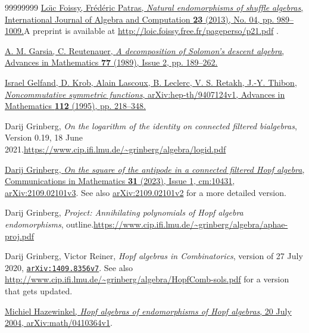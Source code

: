 \documentclass[numbers=enddot,12pt,final,onecolumn,notitlepage]{scrartcl}%
\theoremstyle{definition}
\begin{document}
\begin{thebibliography}{99999999}
%
\href{https://doi.org/10.1142/S0218196713400183}{Lo\"{\i}c Foissy,
Fr\'{e}d\'{e}ric Patras, \textit{Natural endomorphisms of shuffle algebras},
International Journal of Algebra and Computation \textbf{23} (2013), No. 04,
pp. 989--1009.}\newline A preprint is available at
\url{http://loic.foissy.free.fr/pageperso/p21.pdf} .

%
\href{https://doi.org/10.1016/0001-8708(89)90020-0}{A. M. Garsia, C.
Reutenauer, \textit{A decomposition of Solomon's descent algebra}, Advances in
Mathematics \textbf{77} (1989), Issue 2, pp. 189--262.}

\href{https://arxiv.org/abs/hep-th/9407124v1}{Israel
Gelfand, D. Krob, Alain Lascoux, B. Leclerc, V. S. Retakh, J.-Y. Thibon,
\textit{Noncommutative symmetric functions}, arXiv:hep-th/9407124v1, Advances
in Mathematics \textbf{112} (1995), pp. 218--348.}

Darij Grinberg, \textit{On the logarithm of the
identity on connected filtered bialgebras}, Version 0.19, 18 June
2021.\newline\url{https://www.cip.ifi.lmu.de/~grinberg/algebra/logid.pdf}

%
\href{https://doi.org/10.46298/cm.10431}{Darij Grinberg, \textit{On the square
of the antipode in a connected filtered Hopf algebra}, Communications in
Mathematics \textbf{31} (2023), Issue 1, cm:10431},
\href{https://arxiv.org/abs/2109.02101v3}{arXiv:2109.02101v3}. \newline See
also \href{https://arxiv.org/abs/2109.02101v2}{arXiv:2109.02101v2} for a more
detailed version.

Darij Grinberg, \textit{Project: Annihilating
polynomials of Hopf algebra endomorphisms}, outline.\newline\url{https://www.cip.ifi.lmu.de/~grinberg/algebra/aphae-proj.pdf}

Darij Grinberg, Victor Reiner, \textit{Hopf algebras
in Combinatorics}, version of 27 July 2020,
\href{http://www.arxiv.org/abs/1409.8356v7}{\texttt{arXiv:1409.8356v7}}.
\newline See also
\url{http://www.cip.ifi.lmu.de/~grinberg/algebra/HopfComb-sols.pdf} for a
version that gets updated.

%
\href{https://arxiv.org/abs/math/0410364v1}{Michiel Hazewinkel, \textit{Hopf
algebras of endomorphisms of Hopf algebras}, 20 July 2004,
arXiv:math/0410364v1}.


\end{thebibliography}
\end{document}
